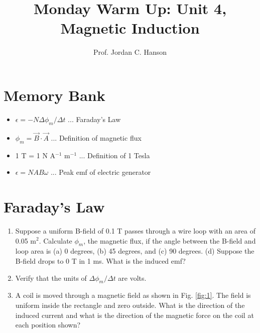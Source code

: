 \documentclass{article}
\begin{document}
\twocolumn

\title{Monday Warm Up: Unit 4, Magnetic Induction}
\author{Prof. Jordan C. Hanson}

\maketitle

\section{Memory Bank}

\begin{itemize}
\item $\epsilon = -N \Delta \phi_m /\Delta t$ ... Faraday's Law
\item $\phi_m = \vec{B} \cdot \vec{A}$ ... Definition of magnetic flux
\item 1 T = 1 N A$^{-1}$ m$^{-1}$ ... Definition of 1 Tesla
\item $\epsilon = N A B \omega$ ... Peak emf of electric generator
\end{itemize}

\section{Faraday's Law}

\begin{enumerate}
\item Suppose a uniform B-field of 0.1 T passes through a wire loop with an area of 0.05 m$^2$.  Calculate $\phi_m$, the magnetic flux, if the angle between the B-field and loop area is (a) 0 degrees, (b) 45 degrees, and (c) 90 degrees.  (d) Suppose the B-field drops to 0 T in 1 ms.  What is the induced emf? \\ \vspace{2cm}
\item Verify that the units of $\Delta \phi_m/\Delta t$ are volts. \\ \vspace{2cm}
\item A coil is moved through a magnetic field as shown in Fig. \ref{fig:1}. The field is uniform inside the rectangle and zero outside. What is the direction of the induced current and what is the direction of the magnetic force on the coil at each position shown? \\ \vspace{2cm}
\end{enumerate}
\end{document}

